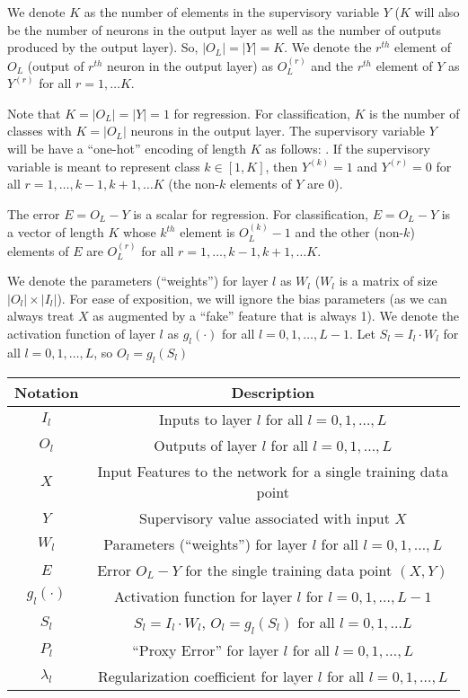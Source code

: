 \documentclass[10pt]{amsart}
\begin{document}
We denote $K$ as the number of elements in the supervisory variable $Y$ ($K$ will also be the number of neurons in the output layer as well as the number of outputs produced by the output layer).  So, $|O_L| = |Y| = K$.  We denote the $r^{th}$ element of $O_L$ (output of $r^{th}$ neuron in the output layer) as $O_L^{(r)}$ and the $r^{th}$ element of $Y$ as $Y^{(r)}$ for all $r = 1, \ldots K$.

Note that $K = |O_L| = |Y| = 1$ for regression. For classification, $K$ is the number of classes with $K = |O_L|$ neurons in the output layer. The supervisory variable $Y$ will be have a ``one-hot'' encoding of length $K$ as follows: . If the supervisory variable is meant to represent class $k \in [1, K]$, then $Y^{(k)} = 1$ and $Y^{(r)} = 0$ for all $r = 1, \ldots, k-1, k+1, \ldots K$ (the non-$k$ elements of $Y$ are 0).

The error $E = O_L - Y$ is a scalar for regression. For classification, $E = O_L - Y$ is a vector of length $K$ whose $k^{th}$ element is $O_L^{(k)} - 1$ and the other (non-$k$) elements of $E$ are $O_L^{(r)}$ for all $r = 1, \ldots, k - 1, k + 1, \ldots K$.

We denote the parameters (``weights'') for layer $l$ as $W_l$ ($W_l$ is a matrix of size $| O_l | \times | I_l |$). For ease of exposition, we will ignore the bias parameters (as we can always treat $X$ as augmented by a ``fake'' feature that is always 1). We denote the activation function of layer $l$ as $g_l(\cdot)$ for all $l = 0, 1, \ldots, L - 1$. Let $S_l = I_l \cdot W_l$ for all $l = 0, 1, \ldots, L$, so $O_l = g_l(S_l)$ 
\begin{center} 
\begin{tabular}{|c|c|}
\hline
\textbf{Notation} & \textbf{Description} \\
\hline
$I_l$ & Inputs to layer $l$ for all $l = 0, 1, \ldots, L$  \\
\hline
$O_l$ & Outputs of layer $l$ for all $l = 0, 1, \ldots, L$ \\
\hline
$X$ & Input Features to the network for a single training data point \\
\hline
 $Y$ & Supervisory value associated with input $X$ \\
\hline
 $W_l$ & Parameters (``weights'') for layer $l$ for all $l = 0, 1, \ldots, L$ \\
 \hline
 $E$ & Error $O_L - Y$ for the single training data point $(X,Y)$ \\
 \hline
 $g_l(\cdot)$ & Activation function for layer $l$ for $l = 0, 1, \ldots, L - 1$ \\
 \hline
 $S_l$ & $S_l = I_l \cdot W_l$, $O_l = g_l(S_l)$ for all $l = 0, 1, \ldots L$ \\
 \hline
 $P_l$ & ``Proxy Error'' for layer $l$ for all $l = 0, 1, \ldots, L$ \\
 \hline
 $\lambda_l$ & Regularization coefficient for layer $l$ for all $l = 0, 1, \ldots, L$ \\
 \hline
\end{tabular}
\end{center}
\end{document}
